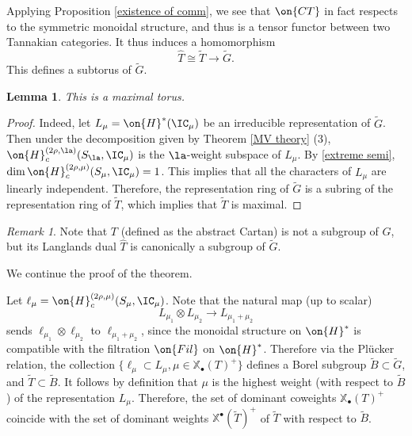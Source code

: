 \documentclass[]{pcmi}
\theoremstyle{plain}
\newtheorem{lem}[equation]{Lemma}
\theoremstyle{remark}
\newtheorem{rmk}[equation]{Remark}
\theoremstyle{definition}
\def\xcoch{\mathbb{X}_\bullet}
\def\xch{\mathbb{X}^\bullet}
\begin{document}
Applying Proposition \ref{existence of comm}, we see that $\on{CT}$ in fact respects to the symmetric monoidal structure, and thus is a tensor functor between two Tannakian categories. It thus induces a homomorphism
\[\hat{T}\cong \tilde T\to \tilde G.\]
This defines a subtorus of $\tilde G$. 
\begin{lem}
This is a maximal torus.
\end{lem} 
\begin{proof}
Indeed, let $L_\mu=\on{H}^*(\IC_\mu)$ be an irreducible representation of $\tilde G$. Then under the decomposition given by Theorem \ref{MV theory} (3), $\on{H}_c^{(2\rho,\la)}(S_\la,\IC_\mu)$ 
is the $\la$-weight subspace of $L_\mu$.
By \eqref{extreme semi},
$\dim \on{H}_c^{(2\rho,\mu)}(S_\mu,\IC_\mu)=1$. This implies that all the characters of $L_\mu$ are linearly independent. Therefore, the representation ring of $\tilde G$ is a subring of the representation ring of $\tilde T$, which implies that $\tilde T$ is maximal.
\end{proof}
\begin{rmk}Note that $T$ (defined as the abstract Cartan) is not a subgroup of $G$, but its Langlands dual $\hat T$ is canonically a subgroup of $\tilde G$.
\end{rmk}




We continue the proof of the theorem.

Let $\ell_\mu=\on{H}_c^{(2\rho,\mu)}(S_\mu,\IC_\mu)$.
Note that the natural map (up to scalar) 
$$L_{\mu_1}\otimes L_{\mu_2}\to L_{\mu_1+\mu_2}$$ sends $\ell_{\mu_1}\otimes\ell_{\mu_2}$ to $\ell_{\mu_1+\mu_2}$, since the monoidal structure on $\on{H}^*$ is compatible with the filtration $\on{Fil}$ on $\on{H}^*$.  Therefore via the Pl\"ucker relation, the collection $\{\ell_\mu\subset L_\mu, \mu\in\xcoch(T)^+\}$ defines a Borel subgroup $\tilde B\subset \tilde G$, and $\tilde T\subset \tilde B$.  
It follows by definition that $\mu$ is the highest weight (with respect to $\tilde B$) of the representation $L_\mu$. Therefore, the set of dominant coweights $\xcoch(T)^+$  coincide with the set of dominant weights $\xch(\tilde T)^+$ of $\tilde T$ with respect to $\tilde B$. 
\end{document}
